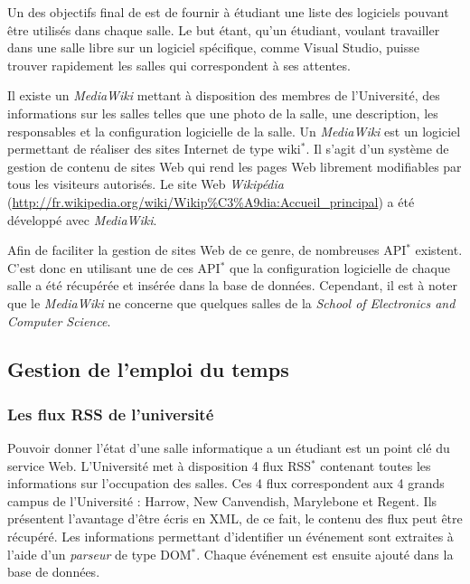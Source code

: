 Un des objectifs final de {\YuukouII} est de fournir \`a \'etudiant une liste des logiciels pouvant \^etre utilis\'es dans chaque salle.
Le but \'etant, qu'un \'etudiant, voulant travailler dans une salle libre sur un logiciel sp\'ecifique, comme Visual Studio, puisse trouver rapidement les salles qui correspondent \`a ses attentes.

Il existe un \textit{MediaWiki} mettant \`a disposition des membres de l'Universit\'e, des informations sur les salles telles que une photo de la salle, une description, les responsables et la configuration logicielle de la salle.
Un \textit{MediaWiki} est un logiciel permettant de r\'ealiser des sites Internet de type wiki$^*$. 
Il s'agit d'un syst\`eme de gestion de contenu de sites Web qui rend les pages Web librement modifiables par tous les visiteurs autoris\'es.
Le site Web \textit{Wikip\'edia} (\url{http://fr.wikipedia.org/wiki/Wikip\%C3\%A9dia:Accueil\_principal}) a \'et\'e d\'evelopp\'e avec \textit{MediaWiki}.

Afin de faciliter la gestion de sites Web de ce genre, de nombreuses API$^*$ existent.
C'est donc en utilisant une de ces API$^*$ que la configuration logicielle de chaque salle a \'et\'e r\'ecup\'er\'ee et ins\'er\'ee dans la base de donn\'ees.
Cependant, il est \`a noter que le \textit{MediaWiki} ne concerne que quelques salles de la \textit{School of Electronics and Computer Science}.

\subsection{Gestion de l'emploi du temps}
\label{section:emploiDuTemps}

\subsubsection{Les flux RSS de l'universit\'e}

Pouvoir donner l'\'etat d'une salle informatique a un \'etudiant est un point cl\'e du service Web.
L'Universit\'e met \`a disposition 4 flux RSS$^*$ contenant toutes les informations sur l'occupation des salles.
Ces 4 flux correspondent aux 4 grands campus de l'Universit\'e : Harrow, New Canvendish, Marylebone et Regent.
Ils pr\'esentent l'avantage d'\^etre \'ecris en XML, de ce fait, le contenu des flux peut \^etre r\'ecup\'er\'e.
Les informations permettant d'identifier un \'ev\'enement sont extraites \`a l'aide d'un \textit{parseur} de type DOM$^*$.
Chaque \'ev\'enement est ensuite ajout\'e dans la base de donn\'ees.


